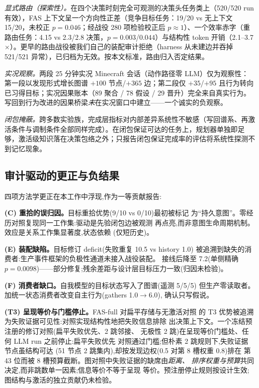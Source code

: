 \documentclass[10pt,a4paper]{ctexart}
\begin{document}
\emph{显式路由（探索性）。}在四个决策时刻完全可观测的决策头任务类上（520/520 run 有效），FAS 上下文呈一个方向性正差（竞争目标任务：19/20 vs 无上下文 15/20，未校正 $p{=}0.046$；经战役 280 项检验校正后 $p{\approx}1$）、一个效率赤字（重路由任务：4.15 vs 2.3/2.8 决策，$p{=}0.003$/$0.044$）与结构性 token 开销（2.1--3.7$\times$）。更早的路由战役被我们自己的装配审计拒绝（harness 从未建边并吞掉 521/521 异常），已归档为无效。按本文标准，路由归入否定结果。

\emph{实况观察。}两段 25 分钟实况 Minecraft 会话（动作路径零 LLM）仅为观察性：第一段以发现形式增长图谱 $+100$ 节点/$+365$ 边；第二段仅 $+35$/$+95$ 且行为转向已习得目标；实况因果账本（89 聚合 / 78 假设 / 29 晋升）完全来自真实行为。写回到行为改进的因果桥梁\emph{未}在实况窗口中建立——一个诚实的负观察。

\emph{闭包掩蔽。}跨多数实验族，完成层指标对内部差异系统性不敏感（写回谱系、再激活条件与调制条件全部同样完成）。在闭包保证可达的任务上，规划器单独即足够，激活级知识落在决策包络之外；只报告闭包保证完成率的评估将系统性探测不到记忆现象。

\subsection{审计驱动的更正与负结果}
\label{sec:audit-negative}

四项方法学更正在本工作中浮现,作为一等贡献报告:

\textbf{(C) 重拾的误归因。}目标重拾优势(9/10 vs 0/10)最初被标记
为``持久意图''。零经历对照复现同一工作集:驱动是先验闭包边被观测
再点亮,而非意图生命周期机制。效应是关系工作集显著度,状态依赖
(仅短历史)。

\textbf{(E) 装配缺陷。}目标修订 deficit(失败重复 10.5 vs history 1.0)
被追溯到缺失的消费者:生产事件框架的负极性通道未接入战役装配。
接线后降至 7.2(单侧精确 $p{=}0.0098$)——部分修复;残余差距与设计层目标压力一致(归因未检验)。

\textbf{(F) 消费者缺口。}自我模型的目标状态写入了图谱(遥测 5/5/5)
但生产零读取者。加统一状态消费者改变自主行为(gathers 1.0$\rightarrow$6.0),
确认只写假说。

\textbf{(T3) 呈现等价与门槛停止。}FAS-full 对扁平存储与无激活对照
的 T3 优势被追溯为失败证据可见性:对照实现结构性地把失败信息排除
出决策上下文。一个冻结预注册的修订对照(扁平失败优先、2 跳邻接、
无极性 2 跳)在呈现等价门槛处、任何 LLM run 之前停止:扁平失败优先
对照通过门槛;但朴素 2 跳规则下,失败证据节点虽结构可达
(51 节点 2 跳集内),却按发现边权(0.5 对第 8 槽权重 0.8)排在
第 43 位而被 8 槽预算截断。图对照中失败证据的缺席由\emph{距离、
排序权重与预算}共同决定,而非跳数单一因素;信息等价不等于呈现
等价。预注册停止规则按设计生效;图结构与激活的独立贡献仍未检验。
\end{document}
